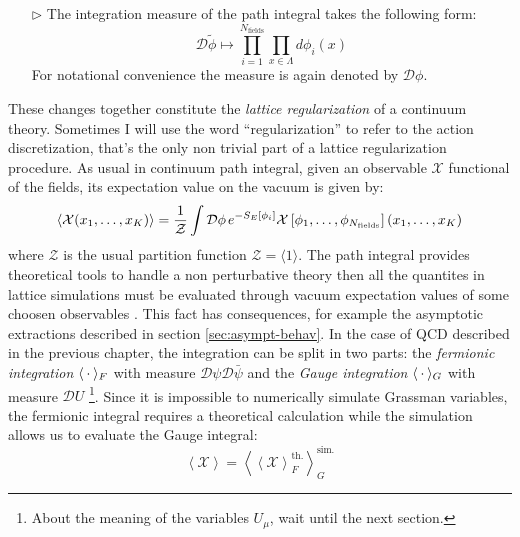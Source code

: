 \documentclass[english, LaM, oneside, noexaminfo]{sapthesis}
\newcommand{\la}{\langle}
\newcommand{\ra}{\rangle}
\begin{document}
\begin{itemize}
    \item [$\triangleright$] The integration measure of the path integral takes the following form:
        \begin{equation*}
            \mathcal{D}\tilde{\phi} \longmapsto \prod_{i=1}^{N_\text{fields}} \prod_{x\in \Lambda} d\phi_i (x)
        \end{equation*}
        For notational convenience the measure is again denoted by $\mathcal{D}\phi$.
\end{itemize}
These changes together constitute the \textit{lattice regularization} of a continuum theory. 
Sometimes I will use the word ``regularization'' to refer to the action discretization, that's the only non trivial part of a lattice regularization procedure. 
\newline
As usual in continuum path integral, given an observable $\mathcal{X}$ functional of the fields, its expectation value on the vacuum is given by:
\begin{equation*}
    \la \mathcal{X} (x_1,\dots,x_K) \ra = \frac{1}{\mathcal Z} \int \mathcal{D} \phi \hspace*{0.5mm} e^{-S_E[\phi_i]} \mathcal{X}\left[\phi_1,\dots,\phi_{N_\text{fields}}\right] (x_1,\dots,x_K)
\end{equation*}
where $\mathcal Z$ is the usual partition function $\mathcal Z = \la 1 \ra$.
The path integral provides theoretical tools to handle a non perturbative theory then all the quantites in lattice simulations must be evaluated through vacuum expectation values of some choosen observables \cite{Itzykson-Zuber}.
This fact has consequences, for example the asymptotic extractions described in section \ref{sec:asympt-behav}.
\newline
In the case of QCD described in the previous chapter, the integration can be split in two parts: the {\it fermionic integration} $\la \hspace*{0.7mm} \cdot \hspace*{0.7mm} \ra_F$ with measure $\mathcal{D}\psi\mathcal{D}\bar\psi$ and the {\it Gauge integration} $\la \hspace*{0.7mm} \cdot \hspace*{0.7mm} \ra_G$ with measure $\mathcal{D}U$ \footnote{About the meaning of the variables $U_\mu$, wait until the next section.}.
Since it is impossible to numerically simulate Grassman variables, the fermionic integral requires a theoretical calculation while the simulation allows us to evaluate the Gauge integral:
\begin{equation*}
    \left\la \mathcal{X} \right\ra = \left\la \left\la \mathcal{X} \right\ra_F^\text{th.} \right\ra_G^\text{sim.}
\end{equation*}
\end{document}
